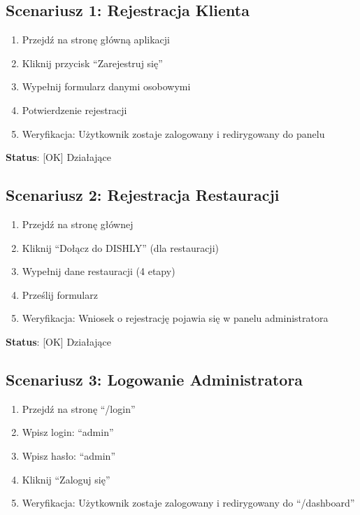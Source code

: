 \documentclass[12pt,a4paper,utf-8]{article}
\begin{document}
\newpage

\subsection{Scenariusz 1: Rejestracja Klienta}

\begin{enumerate}
    \item Przejdź na stronę główną aplikacji
    \item Kliknij przycisk ``Zarejestruj się''
    \item Wypełnij formularz danymi osobowymi
    \item Potwierdzenie rejestracji
    \item Weryfikacja: Użytkownik zostaje zalogowany i redirygowany do panelu
\end{enumerate}

\textbf{Status}: [OK] Działające

\subsection{Scenariusz 2: Rejestracja Restauracji}

\begin{enumerate}
    \item Przejdź na stronę głównej
    \item Kliknij ``Dołącz do DISHLY'' (dla restauracji)
    \item Wypełnij dane restauracji (4 etapy)
    \item Prześlij formularz
    \item Weryfikacja: Wniosek o rejestrację pojawia się w panelu administratora
\end{enumerate}

\textbf{Status}: [OK] Działające

\subsection{Scenariusz 3: Logowanie Administratora}

\begin{enumerate}
    \item Przejdź na stronę ``/login''
    \item Wpisz login: ``admin''
    \item Wpisz hasło: ``admin''
    \item Kliknij ``Zaloguj się''
    \item Weryfikacja: Użytkownik zostaje zalogowany i redirygowany do ``/dashboard''
\end{enumerate}
\end{document}
